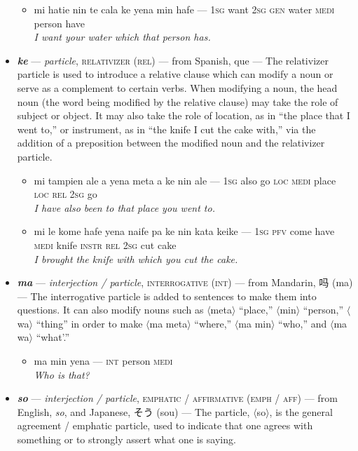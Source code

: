 \documentclass[a4paper, titlepage]{article}
\begin{document}
\begin{itemize}
	\begin{itemize}
		\item mi hatie nin te cala ke yena min hafe — \textsc{1sg} want \textsc{2sg gen} water \textsc{medi} person have \\\textit{I want your water which that person has.}
	\end{itemize}
	\item \textbf{\textit{ke}} —  \textit{particle}, \textsc{relativizer (rel)} — from Spanish, que — The relativizer particle is used to introduce a relative clause which can modify a noun or serve as a complement to certain verbs. When modifying a noun, the head noun (the word being modified by the relative clause) may take the role of subject or object. It may also take the role of location, as in ``the place that I went to,'' or instrument, as in ``the knife I cut the cake with,'' via the addition of a preposition between the modified noun and the relativizer particle.
	\begin{itemize}
		\item mi tampien ale a yena meta a ke nin ale — \textsc{1sg} also go \textsc{loc medi} place \textsc{loc rel 2sg} go \\\textit{I have also been to that place you went to.}
		\item mi le kome hafe yena naife pa ke nin kata keike — \textsc{1sg pfv} come have \textsc{medi} knife \textsc{instr rel 2sg} cut cake \\\textit{I brought the knife with which you cut the cake.}
	\end{itemize}
	\item \textbf{\textit{ma}} —  \textit{interjection / particle}, \textsc{interrogative (int)} — from Mandarin, 吗 (ma) — The interrogative particle is added to sentences to make them into questions. It can also modify nouns such as $\langle$meta$\rangle$ ``place,'' $\langle$min$\rangle$ ``person,'' $\langle$wa$\rangle$ ``thing'' in order to make $\langle$ma meta$\rangle$ ``where,'' $\langle$ma min$\rangle$ ``who,'' and $\langle$ma wa$\rangle$ ``what'.''
	\begin{itemize}
		\item ma min yena — \textsc{int} person \textsc{medi} \\\textit{Who is that?}
	\end{itemize}
	\item \textbf{\textit{so}} — \textit{interjection / particle}, \textsc{emphatic / affirmative (emph / aff)} — from English, \textit{so}, and Japanese, そう (sou) — The particle, $\langle$so$\rangle$, is the general agreement / emphatic particle, used to indicate that one agrees with something or to strongly assert what one is saying.

\end{itemize}
\end{document}

